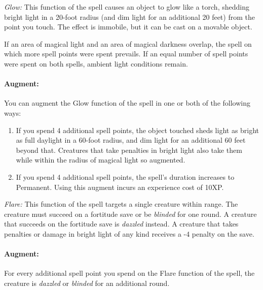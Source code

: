 \begin{list}{}{\leftmargin=1em}
 \item \emph{Glow:} This function of the spell causes an object to glow like a torch, shedding bright light in a 20-foot radius 
(and dim light for an additional 20 feet) from the point you touch. 
The effect is immobile, but it can be cast on a movable object. 

If an area of magical light and an area of magical darkness overlap, 
the spell on which more spell points were spent prevails.
If an equal number of spell points were spent on both spells, ambient light conditions remain.

\paragraph{Augment:} You can augment the Glow function of the spell in one or both of the following ways:
\begin{enumerate}
 \item If you spend 4 additional spell points, the object touched sheds light as bright as full daylight in a 60-foot radius, 
and dim light for an additional 60 feet beyond that. 
Creatures that take penalties in bright light also take them while within the radius of magical light so augmented.
 \item If you spend 4 additional spell points, the spell's duration increases to Permanent. Using this augment incurs an experience cost of 10XP.
\end{enumerate}
\item \emph{Flare:} This function of the spell targets a single creature within range. The creature must succeed on a fortitude save or be \emph{blinded} for one round. A creature that succeeds on the fortitude save is \emph{dazzled} instead.
A creature that takes penalties or damage in bright light of any kind receives a -4 penalty on the save.
\paragraph{Augment:} For every additional spell point you spend on the Flare function of the spell, the creature is 
\emph{dazzled} or \emph{blinded} for an additional round.
\end{list}

